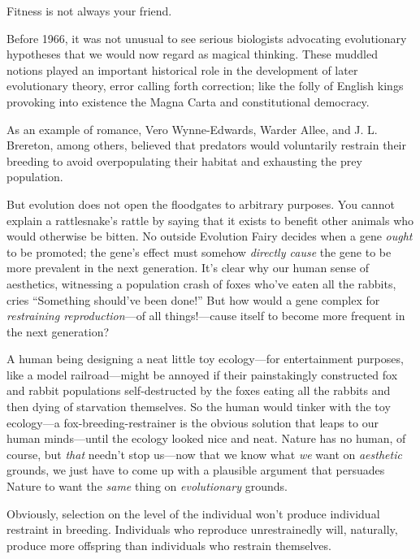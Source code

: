{{
 Fitness is not always your friend.}

\myendsectiontext


{
 Before 1966, it was not unusual to see serious biologists
advocating evolutionary hypotheses that we would now regard as magical
thinking. These muddled notions played an important historical role in
the development of later evolutionary theory, error calling forth
correction; like the folly of English kings provoking into existence
the Magna Carta and constitutional democracy. }

{
 As an example of romance, Vero Wynne-Edwards, Warder Allee, and J.
L. Brereton, among others, believed that predators would voluntarily
restrain their breeding to avoid overpopulating their habitat and
exhausting the prey population.}

{
 But evolution does not open the floodgates to arbitrary purposes.
You cannot explain a rattlesnake's rattle by saying
that it exists to benefit other animals who would otherwise be bitten.
No outside Evolution Fairy decides when a gene \textit{ought} to be
promoted; the gene's effect must somehow
\textit{directly cause} the gene to be more prevalent in the next
generation. It's clear why our human sense of
aesthetics, witnessing a population crash of foxes
who've eaten all the rabbits, cries
``Something should've been
done!'' But how would a gene complex for
\textit{restraining reproduction}{}---of all things!---cause itself to
become more frequent in the next generation?}

{
 A human being designing a neat little toy ecology---for
entertainment purposes, like a model railroad---might be annoyed if
their painstakingly constructed fox and rabbit populations
self-destructed by the foxes eating all the rabbits and then dying of
starvation themselves. So the human would tinker with the toy
ecology---a fox-breeding-restrainer is the obvious solution that leaps
to our human minds---until the ecology looked nice and neat. Nature has
no human, of course, but \textit{that} needn't stop
us---now that we know what \textit{we} want on \textit{aesthetic}
grounds, we just have to come up with a plausible argument that
persuades Nature to want the \textit{same} thing on
\textit{evolutionary} grounds.}

{
 Obviously, selection on the level of the individual
won't produce individual restraint in breeding.
Individuals who reproduce unrestrainedly will, naturally, produce more
offspring than individuals who restrain themselves.}

}

